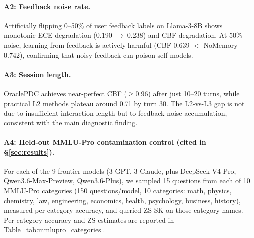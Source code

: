 \documentclass[11pt]{article}
\begin{document}
\paragraph{A2: Feedback noise rate.}
Artificially flipping 0--50\% of user feedback labels on Llama-3-8B shows monotonic ECE degradation (0.190 $\to$ 0.238) and CBF degradation. At 50\% noise, learning from feedback is actively harmful (CBF 0.639 $<$ NoMemory 0.742), confirming that noisy feedback can poison self-models.

\paragraph{A3: Session length.}
OraclePDC achieves near-perfect CBF ($\geq$0.96) after just 10--20 turns, while practical L2 methods plateau around 0.71 by turn 30. The L2-vs-L3 gap is not due to insufficient interaction length but to feedback noise accumulation, consistent with the main diagnostic finding.

\paragraph{A4: Held-out MMLU-Pro contamination control (cited in \S\ref{sec:results}).}
\label{app:heldout}
For each of the 9 frontier models (3 GPT, 3 Claude, plus DeepSeek-V4-Pro, Qwen3.6-Max-Preview, Qwen3.6-Plus), we sampled 15 questions from each of 10 MMLU-Pro categories (150 questions/model, 10 categories: math, physics, chemistry, law, engineering, economics, health, psychology, business, history), measured per-category accuracy, and queried ZS-SK on those category names. Per-category accuracy and ZS estimates are reported in Table~\ref{tab:mmlupro_categories}.
\end{document}
